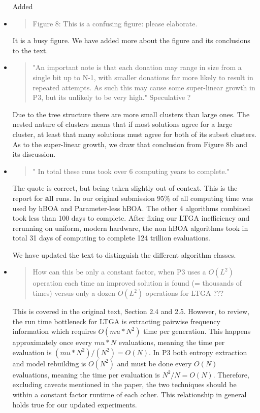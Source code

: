 \documentclass[]{article}
\begin{document}
\begin{itemize}
Added 

\item
\begin{quote}
Figure 8: This is a confusing figure: please elaborate.
\end{quote}

It is a busy figure. We have added more about the figure and its conclusions to the text.

\item
\begin{quote}
 "An important note is that each donation may range in size from a single bit up to N-1, with smaller donations far more likely to result in repeated attempts. As such this may cause some super-linear growth in P3, but its unlikely to be very high."
Speculative ?
\end{quote}

Due to the tree structure there are more small clusters than large ones. The nested nature of clusters means that if most solutions agree for a large cluster, at least that many solutions must agree for both of its subset clusters. As to the super-linear growth, we draw that conclusion from Figure 8b and its discussion.

\item
\begin{quote}
" In total these runs took over 6 computing years to complete."
\end{quote}

The quote is correct, but being taken slightly out of context. This is the report for \textbf{all} runs. In our original submission 95\% of all computing time was used by hBOA and Parameter-less hBOA. The other 4 algorithms combined took less than 100 days to complete. After fixing our LTGA inefficiency and rerunning on uniform, modern hardware, the non hBOA algorithms took in total 31 days of computing to complete 124 trillion evaluations.

We have updated the text to distinguish the different algorithm classes.

\item
\begin{quote}
How can this be only a constant factor, when P3 uses a $O(L^2)$ operation each time an improved solution is found (= thousands of times) versus only a dozen $O(L^2)$ operations for LTGA ???
\end{quote}

This is covered in the original text, Section 2.4 and 2.5. However, to review, the run time bottleneck for LTGA is extracting pairwise frequency information which requires $O(mu*N^2)$ time per generation. This happens approximately once every $mu*N$ evaluations, meaning the time per evaluation is $(mu*N^2) / (N^2) = O(N)$. In P3 both entropy extraction and model rebuilding is $O(N^2)$ and must be done every $O(N)$ evaluations, meaning the time per evaluation is $N^2 / N = O(N)$. Therefore, excluding caveats mentioned in the paper, the two techniques should be within a constant factor runtime of each other. This relationship in general holds true for our updated experiments. 



\end{itemize}
\end{document}
